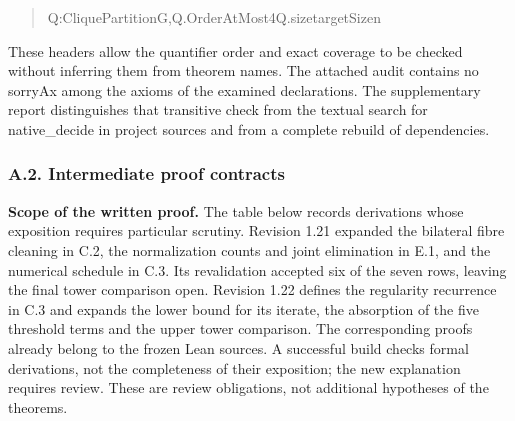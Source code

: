 \documentclass[english,11pt,a4paper]{article}
\newlength{\LeanCharWidth}
\begin{document}
\begin{quote}
\noindent \hspace*{\dimexpr 8\LeanCharWidth\relax}{\LeanSymbols ∃}\hspace*{\dimexpr 1\LeanCharWidth\relax}Q\hspace*{\dimexpr 1\LeanCharWidth\relax}:\hspace*{\dimexpr 1\LeanCharWidth\relax}CliquePartition\hspace*{\dimexpr 1\LeanCharWidth\relax}G,\hspace*{\dimexpr 1\LeanCharWidth\relax}Q.OrderAtMost\hspace*{\dimexpr 1\LeanCharWidth\relax}4\hspace*{\dimexpr 1\LeanCharWidth\relax}{\LeanSymbols ∧}\hspace*{\dimexpr 1\LeanCharWidth\relax}Q.size\hspace*{\dimexpr 1\LeanCharWidth\relax}{\LeanSymbols ≤}\hspace*{\dimexpr 1\LeanCharWidth\relax}targetSize\hspace*{\dimexpr 1\LeanCharWidth\relax}n\par
\end{quote}

These headers allow the quantifier order and exact coverage to be checked without inferring them from theorem names. The attached audit contains no {\ttfamily\small sorryAx} among the axioms of the examined declarations. The supplementary report distinguishes that transitive check from the textual search for {\ttfamily\small native\_\discretionary{\hbox{\ensuremath{\hookrightarrow}}}{}{}decide} in project sources and from a complete rebuild of dependencies.

\subsubsection{A.2. Intermediate proof contracts}\label{a.2.-intermediate-proof-contracts}

\textbf{Scope of the written proof.} The table below records derivations whose exposition requires particular scrutiny. Revision 1.21 expanded the bilateral fibre cleaning in C.2, the normalization counts and joint elimination in E.1, and the numerical schedule in C.3. Its revalidation accepted six of the seven rows, leaving the final tower comparison open. Revision 1.22 defines the regularity recurrence in C.3 and expands the lower bound for its iterate, the absorption of the five threshold terms and the upper tower comparison. The corresponding proofs already belong to the frozen Lean sources. A successful build checks formal derivations, not the completeness of their exposition; the new explanation requires review. These are review obligations, not additional hypotheses of the theorems.
\end{document}
